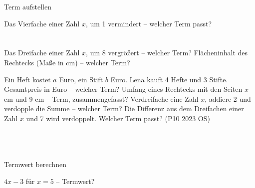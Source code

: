 \setcounter{aufgabe}{6}

\begin{aufgabe}{Term aufstellen}
\begin{teile}
\teil Das Vierfache einer Zahl $x$, um 1 vermindert – welcher Term passt? \\  \\  \\ 
\teil Das Dreifache einer Zahl $x$, um 8 vergrößert – welcher Term? \leerfeld
\teil Flächeninhalt des Rechtecks (Maße in cm) – welcher Term?

\leerfeld
\teil Ein Heft kostet $a$ Euro, ein Stift $b$ Euro. Lena kauft 4 Hefte und 3 Stifte. Gesamtpreis in Euro – welcher Term? \leerfeld
\teil Umfang eines Rechtecks mit den Seiten $x$ cm und 9 cm – Term, zusammengefasst? \leerfeld
\teil Verdreifache eine Zahl $x$, addiere 2 und verdopple die Summe – welcher Term? \leerfeld
\teil Die Differenz aus dem Dreifachen einer Zahl $x$ und 7 wird verdoppelt. Welcher Term passt? \hfill (P10 2023 OS) \\  \\  \\  \\ 
\end{teile}
\end{aufgabe}

\begin{aufgabe}{Termwert berechnen}
\begin{teile}
\teil $4x - 3$ für $x = 5$ – Termwert? \leerfeld
\end{teile}
\end{aufgabe}

